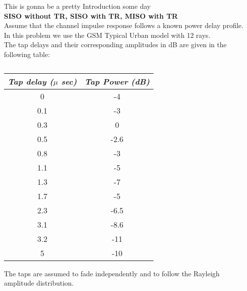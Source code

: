 This is gonna be a pretty Introduction some day\\
\textbf{SISO without TR, SISO with TR, MISO with TR}\\

Assume that the channel impulse response follows a known power delay profile. In this problem we use the GSM Typical Urban model with 12 rays.\\ The tap delays and their corresponding amplitudes in dB are given in the following table: 
\begin{table}[ht]
\centering
\begin{tabular}{c|c}
{\em Tap delay ($\mu$ sec)\/} & {\em Tap Power (dB)\/}  \\
\hline 0 & -4  \\
0.1 & -3 \\
0.3 & 0 \\
0.5 & -2.6\\
0.8 & -3\\
1.1 & -5\\
1.3 & -7\\
1.7 & -5\\
2.3 & -6.5\\
3.1 & -8.6\\
3.2 & -11\\
5 & -10
\end{tabular}\label{Test}
\caption{}
\label{tab:1_intro}
\end{table} 

The taps are assumed to fade independently and to follow the Rayleigh amplitude distribution. 